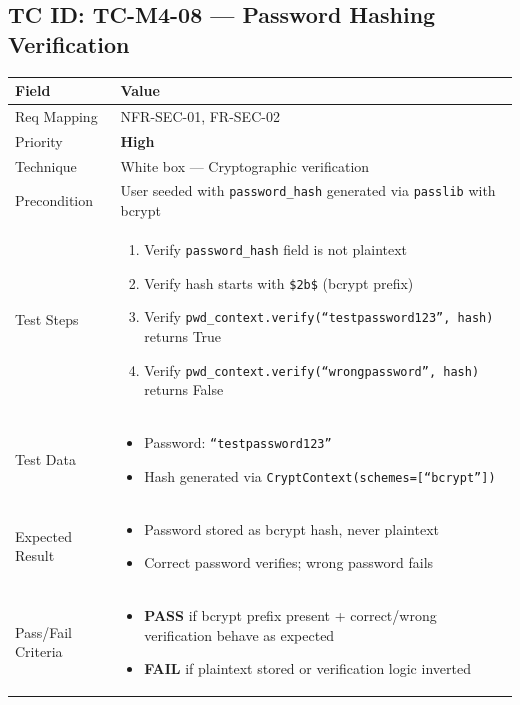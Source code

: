 \documentclass[12pt,a4paper]{article}
\newcommand{\sevhigh}{\textcolor{severityhigh}{\textbf{High}}}
\newcommand{\passresult}{\textcolor{passgreen}{\textbf{PASS}}}
\newcommand{\failresult}{\textcolor{failred}{\textbf{FAIL}}}
\begin{document}
\vspace{0.8cm}

\subsection{TC ID: TC-M4-08 --- Password Hashing Verification}

\begin{tabular}{|p{}|p{}|}
\hline
\rowcolor{lightblue} \textbf{Field} & \textbf{Value} \\
\hline
Req Mapping & NFR-SEC-01, FR-SEC-02 \\
\hline
Priority & \sevhigh \\
\hline
Technique & White box --- Cryptographic verification \\
\hline
Precondition & User seeded with \texttt{password\_hash} generated via \texttt{passlib} with bcrypt \\
\hline
Test Steps &
\begin{enumerate}[nosep, leftmargin=*]
  \item Verify \texttt{password\_hash} field is not plaintext
  \item Verify hash starts with \texttt{\$2b\$} (bcrypt prefix)
  \item Verify \texttt{pwd\_context.verify(``testpassword123'', hash)} returns True
  \item Verify \texttt{pwd\_context.verify(``wrongpassword'', hash)} returns False
\end{enumerate} \\
\hline
Test Data &
\begin{itemize}[nosep, leftmargin=*]
  \item Password: \texttt{``testpassword123''}
  \item Hash generated via \texttt{CryptContext(schemes=[``bcrypt''])}
\end{itemize} \\
\hline
Expected Result &
\begin{itemize}[nosep, leftmargin=*]
  \item Password stored as bcrypt hash, never plaintext
  \item Correct password verifies; wrong password fails
\end{itemize} \\
\hline
Pass/Fail Criteria &
\begin{itemize}[nosep, leftmargin=*]
  \item \passresult{} if bcrypt prefix present + correct/wrong verification behave as expected
  \item \failresult{} if plaintext stored or verification logic inverted
\end{itemize} \\
\hline
\end{tabular}
\end{document}
